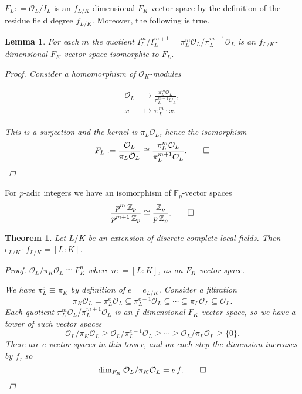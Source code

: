 \documentclass{article}
\newcommand{\isom}{\cong}
\newcommand{\dfn}{\mathrel{\mathop:}=}
\newcommand{\ZZ}{\mathbb{Z}}
\newcommand{\FF}{\mathbb{F}}
\newcommand{\examplesymbol}{$\blacktriangle$}
\renewcommand{\qedsymbol}{$\blacksquare$}
\theoremstyle{myplain}
\newtheorem{lemma}[proposition]{Lemma}
\newtheorem{theorem}[proposition]{Theorem}
\theoremstyle{mydefinition}
\newenvironment{example}
  {\pushQED{\qed}\renewcommand{\qedsymbol}{\examplesymbol}\examplex}
  {\popQED\endexamplex}
\begin{document}
$F_L \dfn \mathcal{O}_L / I_L$ is an $f_{L/K}$-dimensional $F_K$-vector space by the
definition of the residue field degree $f_{L/K}$. Moreover, the following is
true.

\begin{lemma}
  For each $m$ the quotient
  $I_L^m / I_L^{m+1} = \pi_L^m \mathcal{O}_L / \pi_L^{m+1} \mathcal{O}_L$ is an
  $f_{L/K}$-dimensional $F_K$-vector space isomorphic to $F_L$.

  \begin{proof}
    Consider a homomorphism of $\mathcal{O}_K$-modules

    \begin{align*}
      \mathcal{O}_L & \to \frac{\pi_L^m \mathcal{O}_L}{\pi_L^{m+1} \mathcal{O}_L},\\
      x & \mapsto \pi_L^m \cdot x.
    \end{align*}

    This is a surjection and the kernel is $\pi_L \mathcal{O}_L$, hence the isomorphism
    \[ F_L \dfn \frac{\mathcal{O}_L}{\pi_L \mathcal{O}_L} \isom \frac{\pi_L^m \mathcal{O}_L}{\pi_L^{m+1} \mathcal{O}_L}. \qedhere \]
  \end{proof}
\end{lemma}

\begin{example}
  For $p$-adic integers we have an isomorphism of $\FF_p$-vector spaces
  \[ \frac{p^m \, \ZZ_p}{p^{m+1} \, \ZZ_p} \isom \frac{\ZZ_p}{p \, \ZZ_p}. \qedhere \]
\end{example}

\begin{theorem}\label{theorem:efLK}
  Let $L/K$ be an extension of discrete complete local fields. Then
  $e_{L/K}\cdot f_{L/K} = [L:K]$.

  \begin{proof}
    $\mathcal{O}_L / \pi_K \mathcal{O}_L \isom F_K^n$ where $n \dfn [L:K]$, as an $F_K$-vector
    space.

    We have $\pi_L^e \equiv \pi_K$ by definition of $e = e_{L/K}$. Consider a
    filtration
    \[ \pi_K \mathcal{O}_L = \pi_L^e \mathcal{O}_L \subseteq \pi_L^{e-1} \mathcal{O}_L \subseteq \cdots \subseteq \pi_L \mathcal{O}_L \subseteq \mathcal{O}_L. \]
    Each quotient $\pi_L^m \mathcal{O}_L / \pi_L^{m+1} \mathcal{O}_L$ is an $f$-dimensional
    $F_K$-vector space, so we have a tower of such vector spaces
    \[ \mathcal{O}_L / \pi_K \mathcal{O}_L \ge \mathcal{O}_L / \pi_L^{e-1} \mathcal{O}_L \ge \cdots \ge \mathcal{O}_L / \pi_L \mathcal{O}_L \ge \{ 0 \}. \]
    There are $e$ vector spaces in this tower, and on each step the dimension
    increases by $f$, so
    \[ \dim_{F_K} \mathcal{O}_L / \pi_K \mathcal{O}_L = e\,f. \qedhere \]
  \end{proof}
\end{theorem}
\end{document}
